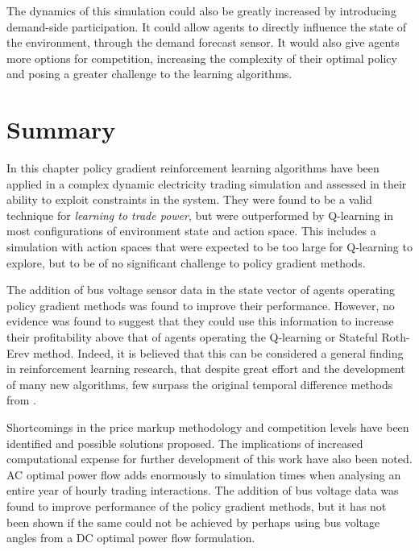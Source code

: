 The dynamics of this simulation could also be greatly increased by introducing
demand-side participation.  It could allow agents to directly influence the
state of the environment, through the demand forecast sensor.  It would
also give agents more options for competition, increasing the complexity of
their optimal policy and posing a greater challenge to the learning algorithms.

\section{Summary}
In this chapter policy gradient reinforcement learning algorithms have been
applied in a complex dynamic electricity trading simulation and assessed in
their ability to exploit constraints in the system.  They were found to be a
valid technique for \textit{learning to trade power}, but were outperformed by
Q-learning in most configurations of environment state and action space.  This
includes a simulation with action spaces that were expected to be too large for
Q-learning to explore, but to be of no significant challenge to policy gradient
methods.

The addition of bus voltage sensor data in the state vector of agents operating
policy gradient methods was found to improve their performance. However, no
evidence was found to suggest that they could use this information to increase
their profitability above that of agents operating the Q-learning or Stateful
Roth-Erev method.  Indeed, it is believed that this can be considered a general
finding in reinforcement learning research, that despite great effort and the
development of many new algorithms, few surpass the original temporal
difference methods from .

Shortcomings in the price markup methodology and competition levels have been
identified and possible solutions proposed.  The implications of increased
computational expense for further development of this work have also been noted.
AC optimal power flow adds enormously to simulation times when analysing an
entire year of hourly trading interactions.  The addition of bus voltage data
was found to improve performance of the policy gradient methods, but it has not
been shown if the same could not be achieved by perhaps using bus voltage angles
from a DC optimal power flow formulation.
